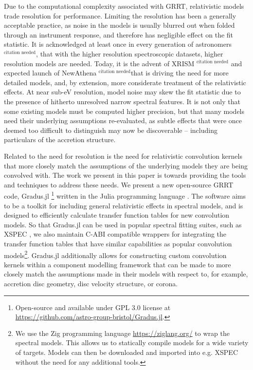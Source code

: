 \documentclass[fleqn,usenatbib]{mnras}
\newcommand{\citneeded}{{\bf \color{red} $^{\text{citation needed}}$}}
\newcommand{\Gradus}{Gradus.jl }
\begin{document}
Due to the computational complexity associated with GRRT, relativistic models
trade resolution for performance. Limiting the resolution has been a generally
acceptable practice, as noise in the models is usually blurred out when folded
through an instrument response, and therefore has negligible effect on the fit
statistic. It is acknowledged at least once in every generation of
astronomers\citneeded, that with the higher resolution spectroscopic datasets,
higher resolution models are needed. Today, it is the advent of XRISM\citneeded
and expected launch of NewAthena \citneeded that is driving the need for more
detailed models, and, by extension, more considerate treatment of the
relativistic effects. At near sub-eV resolution, model noise may skew the fit
statistic due to the presence of hitherto unresolved narrow spectral features.
It is not only that some existing models must be computed higher precision, but
that many models need their underlying assumptions re-evaluated, as subtle
effects that were once deemed too difficult to distinguish may now be
discoverable -- including particulars of the accretion structure.

Related to the need for resolution is the need for relativistic convolution
kernels that more closely match the assumptions of the underlying models they
are being convolved with. The work we present in this paper is towards providing
the tools and techniques to address these needs. We present a new open-source
GRRT code, \Gradus\footnote{Open-source and available under GPL 3.0 license at
\url{https://github.com/astro-group-bristol/Gradus.jl}.} written in the Julia
programming language \citep{Bezanson_Julia_A_fresh_2017}. The software aims to
be a toolkit for including general relativistic effects in spectral models, and
is designed to efficiently calculate transfer function tables for new
convolution models. So that \Gradus can be used in popular spectral fitting
suites, such as XSPEC \citep{arnaud_xspec_1996}, we also maintain C-ABI
compatible wrappers for integrating the transfer function tables that have
similar capabilities as popular convolution models\footnote{We use the Zig
    programming language \url{https://ziglang.org/} to wrap the spectral models.
    This allows us to statically compile models for a wide variety of targets.
    Models can then be downloaded and imported into e.g. XSPEC without the need
    for any additional tools.}. \Gradus additionally allows for constructing
custom convolution kernels within a component modelling framework that can be
made to more closely match the assumptions made in their models with respect to,
for example, accretion disc geometry, disc velocity structure, or corona.
\end{document}
